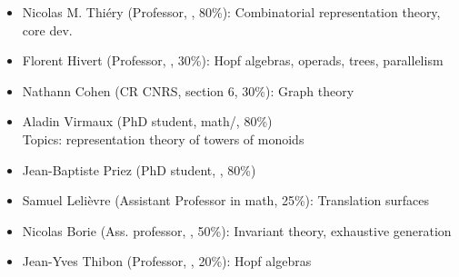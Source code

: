 \begin{itemize}
\item Nicolas M. Thiéry (Professor, \cs, 80\%): Combinatorial
  representation theory, core dev.
\item Florent Hivert (Professor, \cs, 30\%): Hopf algebras, operads,
  trees, parallelism%
\item Nathann Cohen (CR CNRS, section 6, 30\%): Graph theory%
\item Aladin Virmaux (PhD student, math/\cs, 80\%)\\
  Topics: representation theory of towers of monoids
\item Jean-Baptiste Priez (PhD student, \cs, 80\%)
\item Samuel Lelièvre (Assistant Professor in math, 25\%): %
  Translation surfaces%


\item Nicolas Borie (Ass. professor, \cs, 50\%): Invariant theory,
  exhaustive generation%
\item Jean-Yves Thibon (Professor, \cs, 20\%):
  Hopf algebras


\end{itemize}
